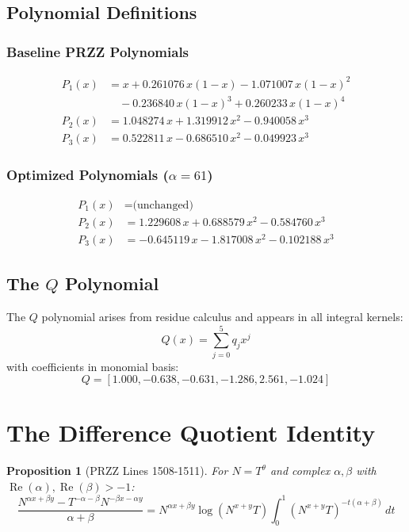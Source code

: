 \documentclass[11pt]{article}
\newtheorem{proposition}{Proposition}
\begin{document}
\subsection{Polynomial Definitions}

\subsubsection{Baseline PRZZ Polynomials}
\begin{align*}
P_1(x) &= x + 0.261076\, x(1-x) - 1.071007\, x(1-x)^2 \\
       &\quad - 0.236840\, x(1-x)^3 + 0.260233\, x(1-x)^4 \\[1ex]
P_2(x) &= 1.048274\, x + 1.319912\, x^2 - 0.940058\, x^3 \\[1ex]
P_3(x) &= 0.522811\, x - 0.686510\, x^2 - 0.049923\, x^3
\end{align*}

\subsubsection{Optimized Polynomials ($\alpha=61$)}
\begin{align*}
P_1(x) &= \text{(unchanged)} \\[1ex]
P_2(x) &= 1.229608\, x + 0.688579\, x^2 -0.584760\, x^3 \\[1ex]
P_3(x) &= -0.645119\, x -1.817008\, x^2 -0.102188\, x^3
\end{align*}

\subsection{The $Q$ Polynomial}

The $Q$ polynomial arises from residue calculus and appears in all integral kernels:
\begin{equation}
Q(x) = \sum_{j=0}^{5} q_j x^j
\end{equation}
with coefficients in monomial basis:
\[
Q = [1.000, -0.638, -0.631, -1.286, 2.561, -1.024]
\]

\section{The Difference Quotient Identity}

\begin{proposition}[PRZZ Lines 1508-1511]
For $N = T^\theta$ and complex $\alpha, \beta$ with $\operatorname{Re}(\alpha), \operatorname{Re}(\beta) > -1$:
\begin{equation}
\frac{N^{\alpha x + \beta y} - T^{-\alpha-\beta} N^{-\beta x - \alpha y}}{\alpha + \beta}
= N^{\alpha x + \beta y} \log(N^{x+y}T) \int_0^1 (N^{x+y}T)^{-t(\alpha+\beta)} \, dt
\end{equation}
\end{proposition}
\end{document}
